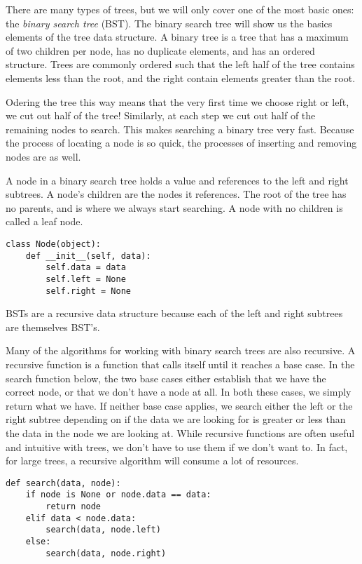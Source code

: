 There are many types of trees, but we will only cover one of the most basic ones: the \emph{binary search tree} (BST).
The binary search tree will show us the basics elements of the tree data structure.
A binary tree is a tree that has a maximum of two children per node,
has no duplicate elements, and has an ordered structure.
Trees are commonly ordered such that the left half of the tree contains elements less than the root, and the right contain elements greater than the root.

Odering the tree this way means that the very first time we choose right or left, we cut out half of the tree!
Similarly, at each step we cut out half of the remaining nodes to search.
This makes searching a binary tree very fast.
Because the process of locating a node is so quick, the processes of inserting and removing nodes are as well.

A node in a binary search tree holds a value and references to the left and right subtrees.
A node's children are the nodes it references.
The root of the tree has no parents, and is where we always start searching.
A node with no children is called a leaf node.

\begin{lstlisting}
class Node(object):
    def __init__(self, data):
        self.data = data
        self.left = None
        self.right = None
\end{lstlisting}

BSTs are a recursive data structure because each of the left and right subtrees are themselves BST's.

Many of the algorithms for working with binary search trees are also recursive.
A recursive function is a function that calls itself until it reaches a base case.
In the search function below, the two base cases either establish that we have the correct
node, or that we don't have a node at all.
In both these cases, we simply return what we have.
If neither base case applies, we search either the left or the right subtree depending on if the data we are looking for is greater or less than the data in the node we are looking at.
While recursive functions are often useful and intuitive with trees, we don't have to use them if we don't want to.
In fact, for large trees, a recursive algorithm will consume a lot of resources.

\begin{lstlisting}
def search(data, node):
    if node is None or node.data == data:
        return node
    elif data < node.data:
        search(data, node.left)
    else:
        search(data, node.right)
\end{lstlisting}

